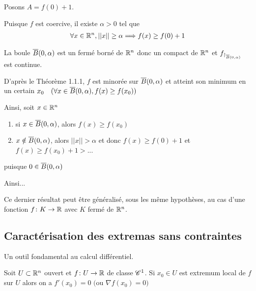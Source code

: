 \documentclass[french,a4paper,10pt]{article}
\begin{document}
	\begin{myproof}
		Posons $A=f(0)+1$.
		
		Puisque $f$ est coercive, il existe $\alpha>0$ tel que
			\[\begin{aligned}
				\forall x\in\mathbb{R}^n,||x||\ge\alpha\Longrightarrow f(x)\ge f(0)+1
			\end{aligned}\]
		
		La boule $\overline{B}(0, \alpha)$ est un fermé borné de $\mathbb{R}^n$ donc un compact de $\mathbb{R}^n$ et ${f}_{\restriction_{\overline{B}(0, \alpha)}}$ est continue.
		
		D'après le Théorème 1.1.1, $f$ est minorée sur $\overline{B}(0, \alpha)$ et atteint son minimum en un certain $x_0\quad(\forall x\in \overline{B}(0, \alpha), f(x)\ge f(x_0))$
		
		Ainsi, soit $x\in \mathbb{R}^n$
		\begin{enumerate}[label=$a\\$]
			\item si $x\in \overline{B}(0, \alpha)$, alors $f(x)\ge f(x_0)$
			\item $x\notin \overline{B}(0, \alpha)$, alors $||x||>\alpha$ et donc $f(x)\ge f(0)+1$ et $f(x)\ge f(x_0)+1>$...
		\end{enumerate}
	
		puisque $0\in \overline{B}(0, \alpha)$
		
		Ainsi...
		
	\end{myproof}

	\begin{myremark}
		Ce dernier résultat peut être généralisé, sous les même hypothèses, au cas d'une fonction $f\colon K\to\mathbb{R}$ avec $K$ fermé de $\mathbb{R}^n$.
		
	\end{myremark}

	\subsection{Caractérisation des extremas sans contraintes}
	
	Un outil fondamental au calcul différentiel.
	
	\begin{theorem}
		Soit $U\subset \mathbb{R}^n$ ouvert et $f\colon U\to\mathbb{R}$ de classe $\mathscr{C}^1$. Si $x_0\in U$ est extremum local de $f$ sur $U$ alors on a $f'(x_0)=0$ $($ou $\nabla f(x_0)=0)$
		
	\end{theorem}
\end{document}

